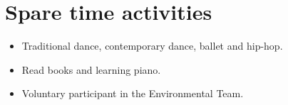 \documentclass[letterpaper]{engineer_cv} %
\begin{document}

	\section{Spare time activities}

	\begin{longList} %
		\longListItem
			{}
			{}
			{}
			{\begin{itemize}
			  \item Traditional dance, contemporary dance, ballet and hip-hop.
			  \item Read books and learning piano.
              \item Voluntary participant in the Environmental Team.
			\end{itemize}}
			{}
			{}
			\\
	\end{longList}

	\raggedleft{\today}
\end{document}
